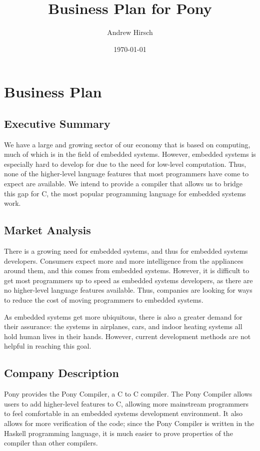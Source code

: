 \documentclass[11pt]{article}
\title{Business Plan for Pony}
\author{Andrew Hirsch}
\date{\today}
\begin{document}
\maketitle



\section{Business Plan}
\label{sec-1}
\subsection{Executive Summary}
\label{sec-1-1}


We have a large and growing sector of our economy that is based on computing, much of which is in the field of embedded systems. However, embedded systems is especially hard to develop for due to the need for low-level computation. Thus, none of the higher-level language features that most programmers have come to expect are available. We intend to provide a compiler that allows us to bridge this gap for C, the most popular programming language for embedded systems work.
\subsection{Market Analysis}
\label{sec-1-2}


There is a growing need for embedded systems, and thus for embedded systems developers. Consumers expect more and more intelligence from the appliances around them, and this comes from embedded systems. However, it is difficult to get most programmers up to speed as embedded systems developers, as there are no higher-level language features available. Thus, companies are looking for ways to reduce the cost of moving programmers to embedded systems.

As embedded systems get more ubiquitous, there is also a greater demand for their assurance: the systems in airplanes, cars, and indoor heating systems all hold human lives in their hands. However, current development methods are not helpful in reaching this goal.
\subsection{Company Description}
\label{sec-1-3}


Pony provides the Pony Compiler, a C to C compiler. The Pony Compiler allows users to add higher-level features to C, allowing more mainstream programmers to feel comfortable in an embedded systems development environment. It also allows for more verification of the code; since the Pony Compiler is written in the Haskell programming language, it is much easier to prove properties of the compiler than other compilers. 
\end{document}
